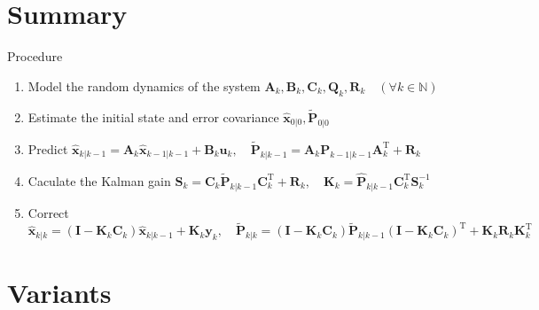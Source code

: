 \documentclass[utf-8, 10pt, aspectratio=1610]{beamer}
\begin{document}
\section{Summary}
\begin{frame}{Procedure}
	\begin{enumerate}
		\setlength\itemsep{1.5em}
		\item Model the random dynamics of the system
		      \newline
		      \(\mathbf{A}_k, \mathbf{B}_k, \mathbf{C}_k, \mathbf{Q}_k, \mathbf{R}_k \quad \left(\forall k \in \mathbb{N}\right)\)
		\item Estimate the initial state and error covariance
		      \newline
		      \(\hat{\mathbf{x}}_{0\vert 0}, \tilde{\mathbf{P}}_{0\vert 0}\)
		\item Predict
		      \newline
		      \(\hat{\mathbf{x}}_{k\vert k-1 } = \mathbf{A}_k \hat{\mathbf{x}}_{k-1\vert k-1} + \mathbf{B}_{k} \mathbf{u}_{k},\quad \tilde{\mathbf{P}}_{k\vert k-1} = \mathbf{A}_k \mathbf{P}_{k-1\vert k-1} \mathbf{A}_k ^{\mathrm{T}} + \mathbf{R}_k\)
		\item Caculate the Kalman gain
		      \newline
		      \(\mathbf{S}_k = \mathbf{C}_k \tilde{\mathbf{P}}_{k\vert k-1} \mathbf{C}_k ^{\mathrm{T}} + \mathbf{R}_k,\quad \mathbf{K}_k = \hat{\mathbf{P}}_{k\vert k-1} \mathbf{C}_k ^{\mathrm{T}} \mathbf{S}_k^{-1}\)
		\item Correct
		      \newline
		      \(\hat{\mathbf{x}}_{k\vert k} = \left(\mathbf{I}-\mathbf{K}_k \mathbf{C}_k\right)\hat{\mathbf{x}}_{k\vert k-1} + \mathbf{K}_k \mathbf{y}_k, \quad \tilde{\mathbf{P}}_{k\vert k} = \left(\mathbf{I}-\mathbf{K}_k \mathbf{C}_k\right) \tilde{\mathbf{P}}_{k\vert k-1} \left(\mathbf{I}-\mathbf{K}_k \mathbf{C}_k\right)^{\mathrm{T}} + \mathbf{K}_k \mathbf{R}_k \mathbf{K}_k ^{\mathrm{T}} \)
	\end{enumerate}
\end{frame}
\section{Variants}
\end{document}
